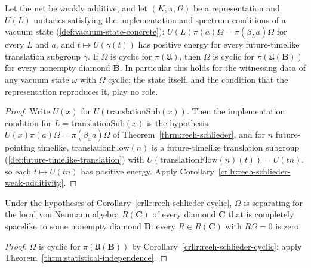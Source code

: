 \begin{corollary}
    \label{crllr:reeh-schlieder-vacuum}
    \leanok
    Let the net be weakly additive, and let $(K, \pi, \Omega)$ be a representation and $U(L)$ unitaries satisfying the implementation and spectrum conditions of a vacuum state (\ref{def:vacuum-state-concrete}): $U(L)\pi(a)\Omega = \pi(\beta_L a)\Omega$ for every $L$ and $a$, and $t \mapsto U(\gamma(t))$ has positive energy for every future-timelike translation subgroup $\gamma$. If $\Omega$ is cyclic for $\pi(\mathfrak{U})$, then $\Omega$ is cyclic for $\pi(\mathfrak{U}(\mathbf{B}))$ for every nonempty diamond $\mathbf{B}$. In particular this holds for the witnessing data of any vacuum state $\omega$ with $\Omega$ cyclic; the state itself, and the condition that the representation reproduces it, play no role.
\end{corollary}
\begin{proof}
    \leanok
    Write $U(x)$ for $U(\mathrm{translationSub}(x))$. Then the implementation condition for $L = \mathrm{translationSub}(x)$ is the hypothesis $U(x)\pi(a)\Omega = \pi(\beta_x a)\Omega$ of Theorem~\ref{thrm:reeh-schlieder}, and for $n$ future-pointing timelike, $\mathrm{translationFlow}(n)$ is a future-timelike translation subgroup (\ref{def:future-timelike-translation}) with $U(\mathrm{translationFlow}(n)(t)) = U(tn)$, so each $t \mapsto U(tn)$ has positive energy. Apply Corollary~\ref{crllr:reeh-schlieder-weak-additivity}.
\end{proof}

\begin{corollary}
    \label{crllr:reeh-schlieder-separating}
    \leanok
    Under the hypotheses of Corollary~\ref{crllr:reeh-schlieder-cyclic}, $\Omega$ is separating for the local von Neumann algebra $R(\mathbf{C})$ of every diamond $\mathbf{C}$ that is completely spacelike to some nonempty diamond $\mathbf{B}$: every $R \in R(\mathbf{C})$ with $R\Omega = 0$ is zero.
\end{corollary}
\begin{proof}
    \leanok
    $\Omega$ is cyclic for $\pi(\mathfrak{U}(\mathbf{B}))$ by Corollary~\ref{crllr:reeh-schlieder-cyclic}; apply Theorem~\ref{thrm:statistical-independence}.
\end{proof}
